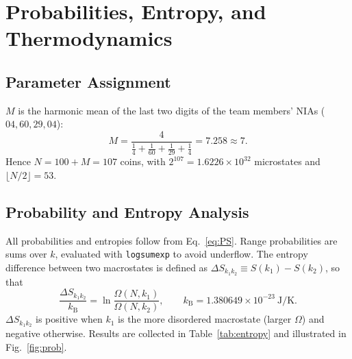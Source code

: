 \documentclass[11pt, a4paper]{article}
\newcommand{\kB}{k_{\mathrm{B}}}
\begin{document}
\section{Probabilities, Entropy, and Thermodynamics}

\subsection{Parameter Assignment}
$M$ is the harmonic mean of the last two digits of the team members' NIAs ($04, 60, 29, 04$):
\begin{equation}
M = \frac{4}{\frac{1}{4} + \frac{1}{60} + \frac{1}{29} + \frac{1}{4}} = 7.258 \approx 7.
\end{equation}
Hence $N=100+M=107$ coins, with $2^{107}=1.6226\times10^{32}$ microstates and $\lfloor N/2 \rfloor = 53$.

\subsection{Probability and Entropy Analysis}
All probabilities and entropies follow from Eq.~\eqref{eq:PS}. Range probabilities are sums over $k$, evaluated with \texttt{logsumexp} to avoid underflow. The entropy difference between two macrostates is defined as $\Delta S_{k_1k_2}\equiv S(k_1)-S(k_2)$, so that
\begin{equation}
\frac{\Delta S_{k_1k_2}}{\kB}=\ln\frac{\Omega(N,k_1)}{\Omega(N,k_2)},\qquad \kB=1.380649\times10^{-23}\ \mathrm{J/K}.
\end{equation}
$\Delta S_{k_1k_2}$ is positive when $k_1$ is the more disordered macrostate (larger $\Omega$) and negative otherwise. Results are collected in Table~\ref{tab:entropy} and illustrated in Fig.~\ref{fig:prob}.
\end{document}

